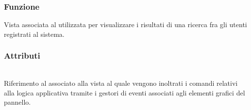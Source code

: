 \subsubsection*{Funzione}
Vista associata al   utilizzata per visualizzare i risultati di una ricerca fra gli utenti registrati al sistema.

\subsubsection*{Attributi}
\begin{description}
  \item{}\\
  Riferimento al  associato alla vista al quale vengono inoltrati i comandi relativi alla logica applicativa tramite i gestori di eventi associati agli elementi grafici del pannello.
\end{description}

